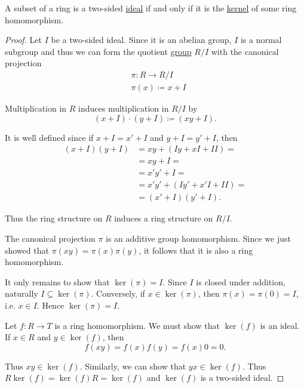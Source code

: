 \begin{definition}\label{thm:semiring_ideal_iff_kernel}
  A subset of a ring is a two-sided \hyperref[def:semiring_ideal]{ideal} if and only if it is the \hyperref[def:semiring_kernel]{kernel} of some ring homomorphism.
\end{definition}
\begin{proof}
  \Implies Let \( I \) be a two-sided ideal. Since it is an abelian group, \( I \) is a normal subgroup and thus we can form the quotient \hyperref[def:normal_subgroup]{group} \( R / I \) with the canonical projection
  \begin{align*}
    &\pi: R \to R / I \\
    &\pi(x) \coloneqq x + I
  \end{align*}

  Multiplication in \( R \) induces multiplication in \( R / I \) by
  \begin{equation*}
    (x + I) \cdot (y + I) \coloneqq (xy + I).
  \end{equation*}

  It is well defined since if \( x + I = x' + I \) and \( y + I = y' + I \), then
  \begin{align*}
    (x + I) (y + I)
    &=
    xy + (Iy + xI + II)
    = \\ &=
    xy + I
    = \\ &=
    x'y' + I
    = \\ &=
    x'y' + (Iy' + x'I + II)
    = \\ &=
    (x' + I) (y' + I).
  \end{align*}

  Thus the ring structure on \( R \) induces a ring structure on \( R / I \).

  The canonical projection \( \pi \) is an additive group homomorphism. Since we just showed that \( \pi(xy) = \pi(x) \pi(y) \), it follows that it is also a ring homomorphism.

  It only remains to show that \( \ker(\pi) = I \). Since \( I \) is closed under addition, naturally \( I \subseteq \ker(\pi) \). Conversely, if \( x \in \ker(\pi) \), then \( \pi(x) = \pi(0) = I \), i.e. \( x \in I \). Hence \( \ker(\pi) = I \).

  \ImpliedBy Let \( f: R \to T \) is a ring homomorphism. We must show that \( \ker(f) \) is an ideal. If \( x \in R \) and \( y \in \ker(f) \), then
  \begin{equation*}
    f(xy) = f(x) f(y) = f(x) 0 = 0.
  \end{equation*}

  Thus \( xy \in \ker(f) \). Similarly, we can show that \( yx \in \ker(f) \). Thus \( R \ker(f) = \ker(f) R = \ker(f) \) and \( \ker(f) \) is a two-sided ideal.
\end{proof}

